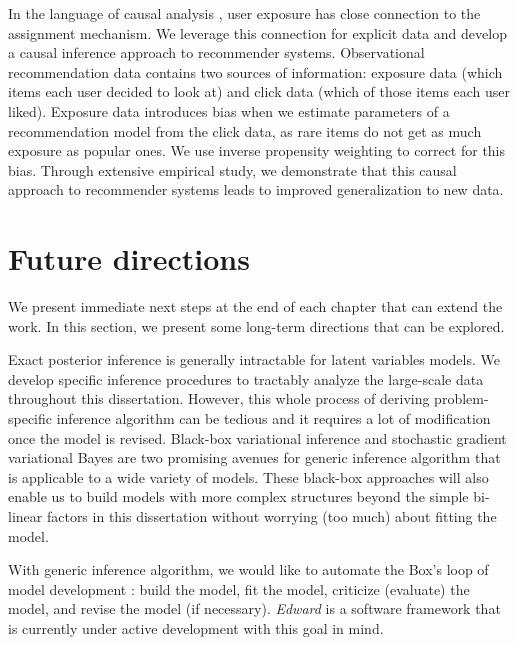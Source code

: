 In the language of causal analysis \citep{imbens2015causal}, user exposure has close connection to the assignment mechanism. We leverage this connection for explicit data and develop a causal inference approach to recommender systems. 
Observational recommendation data contains two sources of
information: exposure data (which items each user decided to look at) and click data (which of
those items each user liked). Exposure data introduces bias when we estimate parameters of a recommendation model from the click data, as rare items do not get as much exposure as popular ones. We use inverse propensity weighting to correct for this bias. Through extensive empirical study, we demonstrate that this causal approach to recommender systems leads to improved generalization to new data.

\section{Future directions}

We present immediate next steps at the end of each chapter that can extend the work. In this section, we present some long-term directions that can be explored.

Exact posterior inference is generally intractable for latent variables models. We develop specific inference procedures to tractably analyze the large-scale data throughout this dissertation. However, this whole process of deriving problem-specific inference algorithm can be tedious and it requires a lot of modification once the model is revised. Black-box variational inference \citep{DBLP:conf/aistats/RanganathGB14,kucukelbir2015automatic} and stochastic gradient variational Bayes \citep{kingma2013auto} are two promising avenues for generic inference algorithm that is applicable to a wide variety of models. These black-box approaches will also enable us to build models with more complex structures beyond the simple bi-linear factors in this dissertation without worrying (too much) about fitting the model.   

With generic inference algorithm, we would like to automate the Box's loop of model development \citep{box1976science,blei2014build}: build the model, fit the model, criticize (evaluate) the model, and revise the model (if necessary). 
\textit{Edward} \citep{tran2016edward} is a software framework that is currently under active development with this goal in mind. 

